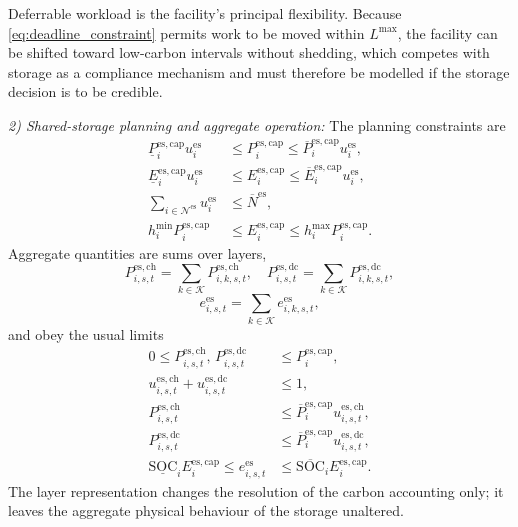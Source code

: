 \documentclass[journal]{IEEEtran}
\begin{document}
Deferrable workload is the facility's principal flexibility. Because
\eqref{eq:deadline_constraint} permits work to be moved within
$L^{\max}$, the facility can be shifted toward low-carbon intervals
without shedding, which competes with storage as a compliance mechanism
and must therefore be modelled if the storage decision is to be credible.

\emph{2) Shared-storage planning and aggregate operation:}
The planning constraints are
\begin{align}
\underline{P}_i^{\mathrm{es,cap}}u_i^{\mathrm{es}}
&\leq P_i^{\mathrm{es,cap}}
\leq\overline{P}_i^{\mathrm{es,cap}}u_i^{\mathrm{es}},
\label{eq:storage_power_capacity}\\
\underline{E}_i^{\mathrm{es,cap}}u_i^{\mathrm{es}}
&\leq E_i^{\mathrm{es,cap}}
\leq\overline{E}_i^{\mathrm{es,cap}}u_i^{\mathrm{es}},
\label{eq:storage_energy_capacity}\\
\sum_{i\in\mathcal{N}^{\mathrm{es}}}u_i^{\mathrm{es}}
&\leq\overline{N}^{\mathrm{es}},
\label{eq:storage_site_limit}\\
h_i^{\min}P_i^{\mathrm{es,cap}}
&\leq E_i^{\mathrm{es,cap}}
\leq h_i^{\max}P_i^{\mathrm{es,cap}}.
\label{eq:storage_duration}
\end{align}
Aggregate quantities are sums over layers,
\begin{equation}
P_{i,s,t}^{\mathrm{es,ch}}
=\!\sum_{k\in\mathcal{K}}\!P_{i,k,s,t}^{\mathrm{es,ch}},
\quad
P_{i,s,t}^{\mathrm{es,dc}}
=\!\sum_{k\in\mathcal{K}}\!P_{i,k,s,t}^{\mathrm{es,dc}},
\label{eq:aggregate_power}
\end{equation}
\begin{equation}
e_{i,s,t}^{\mathrm{es}}
=\sum_{k\in\mathcal{K}}e_{i,k,s,t}^{\mathrm{es}},
\label{eq:aggregate_energy}
\end{equation}
and obey the usual limits
\begin{align}
0\leq P_{i,s,t}^{\mathrm{es,ch}},\,P_{i,s,t}^{\mathrm{es,dc}}
&\leq P_i^{\mathrm{es,cap}},
\label{eq:aggregate_power_limit}\\
u_{i,s,t}^{\mathrm{es,ch}}+u_{i,s,t}^{\mathrm{es,dc}}
&\leq1,
\label{eq:charge_discharge_exclusion}\\
P_{i,s,t}^{\mathrm{es,ch}}
&\leq\overline{P}_i^{\mathrm{es,cap}}u_{i,s,t}^{\mathrm{es,ch}},
\label{eq:charge_status}\\
P_{i,s,t}^{\mathrm{es,dc}}
&\leq\overline{P}_i^{\mathrm{es,cap}}u_{i,s,t}^{\mathrm{es,dc}},
\label{eq:discharge_status}\\
\underline{\mathrm{SOC}}_iE_i^{\mathrm{es,cap}}
\leq e_{i,s,t}^{\mathrm{es}}
&\leq\overline{\mathrm{SOC}}_iE_i^{\mathrm{es,cap}}.
\label{eq:SOC_limit}
\end{align}
The layer representation changes the resolution of the carbon accounting
only; it leaves the aggregate physical behaviour of the storage
unaltered.
\end{document}
